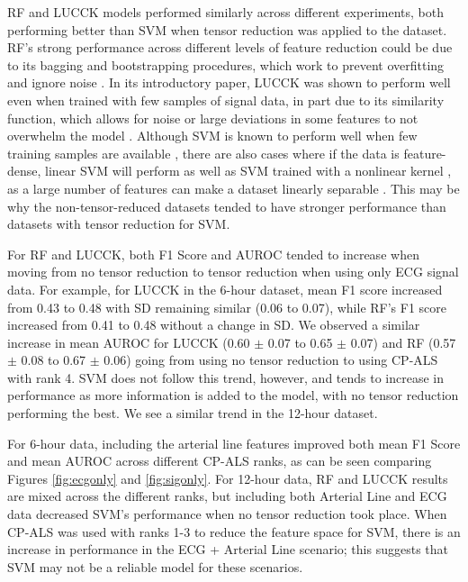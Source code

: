 
RF and LUCCK models performed similarly across different experiments, both performing better than SVM when tensor reduction was applied to the dataset. RF's strong performance across different levels of feature reduction could be due to its bagging and bootstrapping procedures, which work to prevent overfitting and ignore noise \autocite{zhang_random_2012, breiman_random_2001}. In its introductory paper, LUCCK was shown to perform well even when trained with few samples of signal data, in part due to its similarity function, which allows for noise or large deviations in some features to not overwhelm the model \autocite{sabeti_learning_2019}. Although SVM is known to perform well when few training samples are available \autocite{gholami_support_2017}, there are also cases where if the data is feature-dense, linear SVM will perform as well as SVM trained with a nonlinear kernel \autocite{hsieh_dual_2008}, as a large number of features can make a dataset linearly separable \autocite{cervantes_comprehensive_2020}. This may be why the non-tensor-reduced datasets tended to have stronger performance than datasets with tensor reduction for SVM.

For RF and LUCCK, both F1 Score and AUROC tended to increase when moving from no tensor reduction to tensor reduction when using only ECG signal data. For example, for LUCCK in the 6-hour dataset, mean F1 score increased from 0.43 to 0.48 with SD remaining similar (0.06 to 0.07), while RF's F1 score increased from 0.41 to 0.48 without a change in SD. We observed a similar increase in mean AUROC for LUCCK (0.60 $\pm$ 0.07 to 0.65 $\pm$ 0.07) and RF (0.57 $\pm$ 0.08 to 0.67 $\pm$ 0.06) going from using no tensor reduction to using CP-ALS with rank 4. SVM does not follow this trend, however, and tends to increase in performance as more information is added to the model, with no tensor reduction performing the best. We see a similar trend in the 12-hour dataset.

For 6-hour data, including the arterial line features improved both mean F1 Score and mean AUROC across different CP-ALS ranks, as can be seen comparing Figures \ref{fig:ecgonly} and \ref{fig:sigonly}. For 12-hour data, RF and LUCCK results are mixed across the different ranks, but including both Arterial Line and ECG data decreased SVM's performance when no tensor reduction took place. When CP-ALS was used with ranks 1-3 to reduce the feature space for SVM, there is an increase in performance in the ECG + Arterial Line scenario; this suggests that SVM may not be a reliable model for these scenarios.

